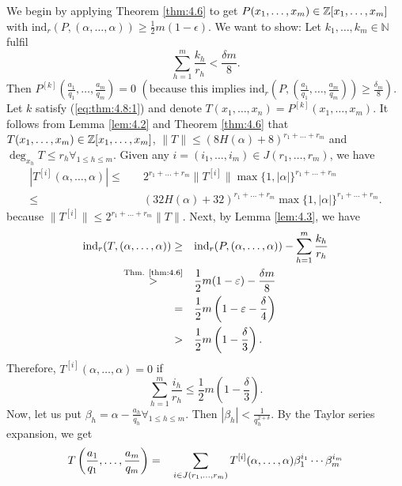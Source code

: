 \documentclass{Vorlesungstemplate_English} %
\newcommand{\Nzero}{\mathbb{N}}
\begin{document}
\begin{pf}
  We begin by applying Theorem \ref{thm:4.6} to get $P(x_1, \dots, x_m) \in \Z[x_1, \dots, x_m]$ with $\text{ind}_r(P, (\alpha, \dots, \alpha)) \geq \frac{1}{2}m(1-\epsilon)$. We want to show: Let $k_1, \dots, k_m \in \Nzero$ fulfil
  \begin{equation}\label{eq:thm:4.8:1} \sum_{h=1}^m \frac{k_h}{r_h} < \frac{\delta m}{8}. \tag{$*$} \end{equation}
  Then $P^{[k]}\left(\frac{a_1}{q_1}, \dots, \frac{a_m}{q_m}\right) = 0$ $\left(\text{because this implies } \text{ind}_r\left(P, \left(\frac{a_1}{q_1}, \dots, \frac{a_m}{q_m}\right)\right) \geq \frac{\delta_m}{8}\right)$. Let $k$ satisfy (\ref{eq:thm:4.8:1}) and denote $T(x_1, \dots, x_n) = P^{[k]}(x_1, \dots, x_m)$. It follows from Lemma \ref{lem:4.2} and Theorem \ref{thm:4.6} that $T(x_1, \dots, x_m) \in \Z[x_1, \dots, x_m]$, $\|T\| \leq (8H(\alpha)+8)^{r_1+\dots+r_m}$ and $\deg_{x_h}T \leq r_h \forall_{1 \leq h \leq m}$. Given any $i = (i_1, \dots, i_m) \in J(r_1, \dots, r_m)$, we have
  \begin{align*} \left| T^{[i]}(\alpha, \dots, \alpha)\right| \leq \quad & 2^{r_1+\dots+r_m}\|T^{[i]}\|\max\{1, |\alpha|\}^{r_1+\dots+r_m} \\
  \leq \quad & (32H(\alpha)+32)^{r_1+\dots+r_m}\max\{ 1, |\alpha|\}^{r_1+\dots+r_m}.\end{align*}
  because $\|T^{[i]}\| \leq 2^{r_1+\dots+r_m}\|T\|$. Next, by Lemma \ref{lem:4.3}, we have
  \begin{align*} \text{ind}_r(T, (\alpha, \dots, \alpha)) \geq \quad & \text{ind}_r(P,(\alpha, \dots, \alpha)) - \sum_{h=1}^m\frac{k_h}{r_h} \\
  \stackrel{\text{Thm. \ref{thm:4.6}}}{>} \quad & \frac{1}{2}m(1-\epsilon)-\frac{\delta m}{8} \\
  = \quad & \frac{1}{2}m\left(1-\epsilon-\frac{\delta}{4}\right) \\
  > \quad & \frac{1}{2}m\left(1-\frac{\delta}{3}\right).\end{align*}
  Therefore, $T^{[i]}(\alpha, \dots, \alpha) = 0$ if
  \[ \sum_{h=1}^m \frac{i_h}{r_h} \leq \frac{1}{2}m\left(1-\frac{\delta}{3}\right).\]
  Now, let us put $\beta_h = \alpha - \frac{a_h}{q_h} \forall_{1 \leq h \leq m}$. Then $|\beta_h| < \frac{1}{q_h^{2+\delta}}$. By the Taylor series expansion, we get
  \begin{align}\label{eq:thm:4.8:2}
    T\left(\frac{a_1}{q_1}, \dots, \frac{a_m}{q_m}\right) = \quad & \sum_{i \in J(r_1, \dots, r_m)} T^{[i]}(\alpha, \dots, \alpha)\beta_1^{i_1}\cdots\beta_m^{i_m} \notag \\

\end{align}
\end{pf}
\end{document}
